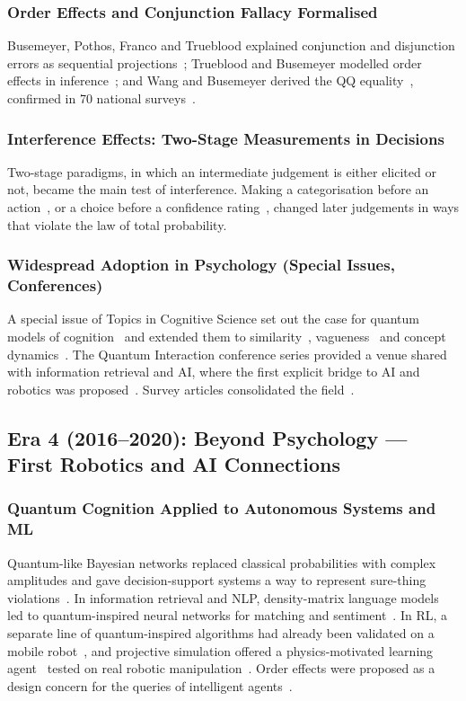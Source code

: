 \documentclass[pdflatex,sn-basic]{sn-jnl}
\begin{document}
\subsubsection{Order Effects and Conjunction Fallacy Formalised}
Busemeyer, Pothos, Franco and Trueblood explained conjunction and disjunction errors as sequential projections~\citep{Busemeyer2011}; Trueblood and Busemeyer modelled order effects in inference~\citep{Trueblood2011}; and Wang and Busemeyer derived the QQ equality~\citep{Wang2013b}, confirmed in 70 national surveys~\citep{Wang2014}.

\subsubsection{Interference Effects: Two-Stage Measurements in Decisions}
Two-stage paradigms, in which an intermediate judgement is either elicited or not, became the main test of interference. Making a categorisation before an action~\citep{Wang2016}, or a choice before a confidence rating~\citep{Kvam2015}, changed later judgements in ways that violate the law of total probability.

\subsubsection{Widespread Adoption in Psychology (Special Issues, Conferences)}
A special issue of Topics in Cognitive Science set out the case for quantum models of cognition~\citep{Wang2013a} and extended them to similarity~\citep{Pothos2013b}, vagueness~\citep{Blutner2013} and concept dynamics~\citep{Aerts2013}. The Quantum Interaction conference series provided a venue shared with information retrieval and AI, where the first explicit bridge to AI and robotics was proposed~\citep{Aerts2011d,Aerts2011b}. Survey articles consolidated the field~\citep{Ashtiani2015,Bruza2015}.

\subsection{Era 4 (2016--2020): Beyond Psychology --- First Robotics and AI Connections}\label{sec:era4}

\subsubsection{Quantum Cognition Applied to Autonomous Systems and ML}
Quantum-like Bayesian networks replaced classical probabilities with complex amplitudes and gave decision-support systems a way to represent sure-thing violations~\citep{Moreira2016,Moreira2017a}. In information retrieval and NLP, density-matrix language models~\citep{Sordoni2013} led to quantum-inspired neural networks for matching and sentiment~\citep{Zhang2018,Li2019}. In RL, a separate line of quantum-inspired algorithms had already been validated on a mobile robot~\citep{Dong2008,Dong2012}, and projective simulation offered a physics-motivated learning agent~\citep{Briegel2012} tested on real robotic manipulation~\citep{Hangl2016}. Order effects were proposed as a design concern for the queries of intelligent agents~\citep{Kak2018}.
\end{document}
